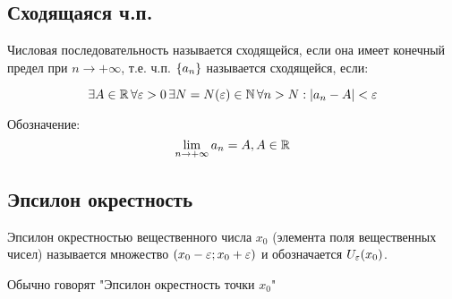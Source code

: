 \subsection{Сходящаяся ч.п.}

{
    Числовая последовательность называется сходящейся, если она имеет конечный предел при $ n \to +\infty $, т.е.
    ч.п. $ \{ a_n \} $ называется сходящейся, если:

    \[ \exists A \in \Rset \, \forall \veps > 0 \, \exists N = N(\veps) \in \mathbb{N} \, \forall n > N: | a_n - A | < \veps \]

    Обозначение:
    \[ \lim_{n \to +\infty} a_n = A, A \in \Rset \]
}



\subsection{Эпсилон окрестность}

{
    Эпсилон окрестностью вещественного числа $ x_0 $ (элемента поля вещественных чисел)
    называется множество $ (x_0 - \varepsilon; x_0 + \varepsilon) $ и обозначается $ U_{\varepsilon}(x_0) $.

    Обычно говорят "Эпсилон окрестность точки $ x_0 $"
}

